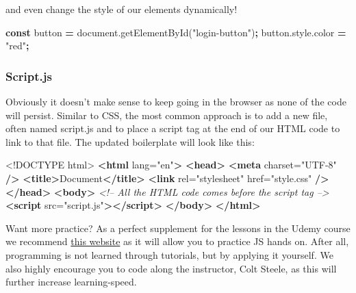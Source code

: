 \documentclass[
]{article}
\newenvironment{Shaded}{\begin{snugshade}}{\end{snugshade}}
\newcommand{\AttributeTok}[1]{\textcolor[rgb]{0.77,0.63,0.00}{#1}}
\newcommand{\CommentTok}[1]{\textcolor[rgb]{0.56,0.35,0.01}{\textit{#1}}}
\newcommand{\DataTypeTok}[1]{\textcolor[rgb]{0.13,0.29,0.53}{#1}}
\newcommand{\KeywordTok}[1]{\textcolor[rgb]{0.13,0.29,0.53}{\textbf{#1}}}
\newcommand{\NormalTok}[1]{#1}
\newcommand{\OperatorTok}[1]{\textcolor[rgb]{0.81,0.36,0.00}{\textbf{#1}}}
\newcommand{\OtherTok}[1]{\textcolor[rgb]{0.56,0.35,0.01}{#1}}
\newcommand{\StringTok}[1]{\textcolor[rgb]{0.31,0.60,0.02}{#1}}
\newcommand{\VariableTok}[1]{\textcolor[rgb]{0.00,0.00,0.00}{#1}}
\begin{document}
and even change the style of our elements dynamically!

\begin{Shaded}
\begin{Highlighting}[]
\KeywordTok{const}\NormalTok{ button }\OperatorTok{=} \VariableTok{document}\NormalTok{.}\AttributeTok{getElementById}\NormalTok{(}\StringTok{"login-button"}\NormalTok{)}\OperatorTok{;}
\VariableTok{button}\NormalTok{.}\VariableTok{style}\NormalTok{.}\AttributeTok{color} \OperatorTok{=} \StringTok{"red"}\OperatorTok{;}
\end{Highlighting}
\end{Shaded}

\hypertarget{script.js}{%
\subsubsection*{Script.js}\label{script.js}}

Obviously it doesn't make sense to keep going in the browser as none of the code will persist. Similar to CSS, the most common approach is to add a new file, often named script.js and to place a script tag at the end of our HTML code to link to that file. The updated boilerplate will look like this:

\begin{Shaded}
\begin{Highlighting}[]
\DataTypeTok{<!DOCTYPE }\NormalTok{html}\DataTypeTok{>}
\KeywordTok{<html}\OtherTok{ lang=}\StringTok{"en"}\KeywordTok{>}
  \KeywordTok{<head>}
    \KeywordTok{<meta}\OtherTok{ charset=}\StringTok{"UTF-8"} \KeywordTok{/>}
    \KeywordTok{<title>}\NormalTok{Document}\KeywordTok{</title>}
    \KeywordTok{<link}\OtherTok{ rel=}\StringTok{"stylesheet"}\OtherTok{ href=}\StringTok{"style.css"} \KeywordTok{/>}
  \KeywordTok{</head>}
  \KeywordTok{<body>}
    \CommentTok{<!-- All the HTML code comes before the script tag -->}
    \KeywordTok{<script}\OtherTok{ src=}\StringTok{"script.js"}\KeywordTok{></script>}
  \KeywordTok{</body>}
\KeywordTok{</html>}
\end{Highlighting}
\end{Shaded}

Want more practice? As a perfect supplement for the lessons in the Udemy course we recommend \href{https://learnjavascript.online/}{this website} as it will allow you to practice JS hands on. After all, programming is not learned through tutorials, but by applying it yourself. We also highly encourage you to code along the instructor, Colt Steele, as this will further increase learning-speed.
\end{document}
